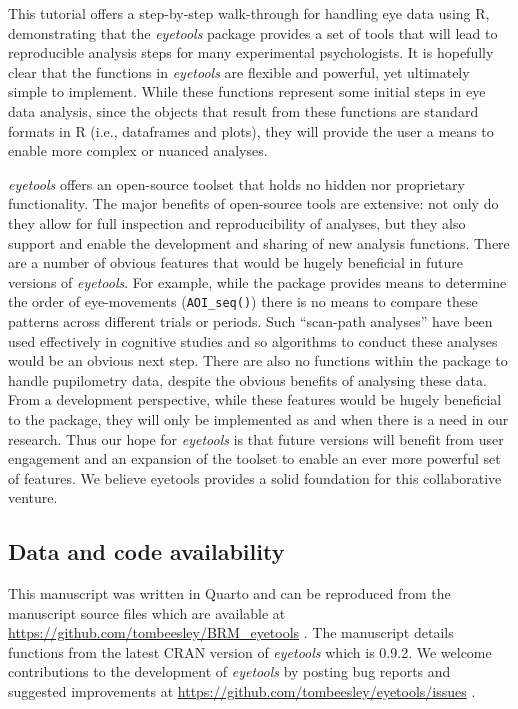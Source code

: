 \documentclass[
  man,
  floatsintext,
  longtable,
  nolmodern,
  notxfonts,
  notimes,
  colorlinks=true,linkcolor=blue,citecolor=blue,urlcolor=blue]{apa7}
\begin{document}
This tutorial offers a step-by-step walk-through for handling eye data
using R, demonstrating that the \emph{eyetools} package provides a set
of tools that will lead to reproducible analysis steps for many
experimental psychologists. It is hopefully clear that the functions in
\emph{eyetools} are flexible and powerful, yet ultimately simple to
implement. While these functions represent some initial steps in eye
data analysis, since the objects that result from these functions are
standard formats in R (i.e., dataframes and plots), they will provide
the user a means to enable more complex or nuanced analyses.

\emph{eyetools} offers an open-source toolset that holds no hidden nor
proprietary functionality. The major benefits of open-source tools are
extensive: not only do they allow for full inspection and
reproducibility of analyses, but they also support and enable the
development and sharing of new analysis functions. There are a number of
obvious features that would be hugely beneficial in future versions of
\emph{eyetools}. For example, while the package provides means to
determine the order of eye-movements (\texttt{AOI\_seq()}) there is no
means to compare these patterns across different trials or periods. Such
``scan-path analyses'' have been used effectively in cognitive studies
and so algorithms to conduct these analyses would be an obvious next
step. There are also no functions within the package to handle
pupilometry data, despite the obvious benefits of analysing these data.
From a development perspective, while these features would be hugely
beneficial to the package, they will only be implemented as and when
there is a need in our research. Thus our hope for \emph{eyetools} is
that future versions will benefit from user engagement and an expansion
of the toolset to enable an ever more powerful set of features. We
believe eyetools provides a solid foundation for this collaborative
venture.

\subsection{Data and code
availability}\label{data-and-code-availability}

This manuscript was written in Quarto and can be reproduced from the
manuscript source files which are available at
\url{https://github.com/tombeesley/BRM_eyetools} . The manuscript
details functions from the latest CRAN version of \emph{eyetools} which
is 0.9.2. We welcome contributions to the development of \emph{eyetools}
by posting bug reports and suggested improvements at
\url{https://github.com/tombeesley/eyetools/issues} .
\end{document}
